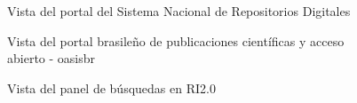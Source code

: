 \begin{figure}[!ht]
    \centering
    \caption{Vista del portal del Sistema Nacional de Repositorios Digitales} %
    \label{snrd1}
\end{figure}

\begin{figure}[!ht]
    \centering
    \caption{Vista del portal brasile\~{n}o de publicaciones cient\'ificas y acceso abierto - oasisbr} %
    \label{oasisbr-1}
\end{figure}

\begin{figure}[!ht]
    \centering
    \caption{Vista del panel de b\'usquedas en RI2.0} %
    \label{ri2.0-2}
\end{figure}

